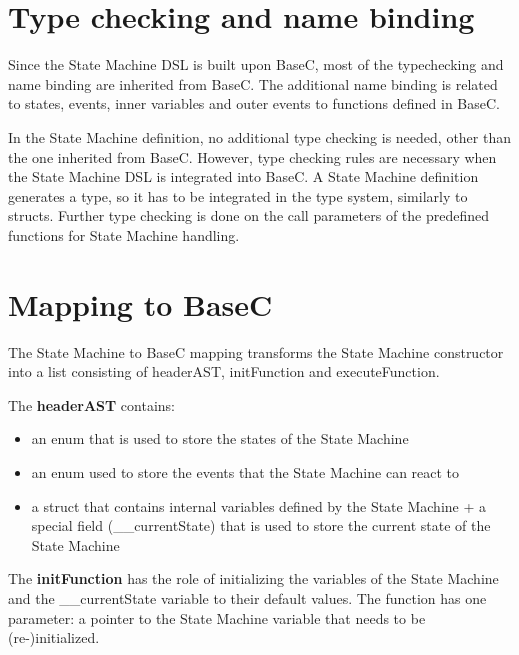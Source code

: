 \documentclass[a4paper,10pt,titlepage]{report}
\begin{document}
\section{Type checking and name binding}
Since the State Machine DSL is built upon BaseC, most of the typechecking and name binding are inherited from BaseC. The additional name binding is related to states, events, inner variables and outer events to functions defined in BaseC. 

In the State Machine definition, no additional type checking is needed, other than the one inherited from BaseC. However, type checking rules are necessary when the State Machine DSL is integrated into BaseC. A State Machine definition generates a type, so it has to be integrated in the type system, similarly to structs. Further type checking is done on the call parameters of the predefined functions for State Machine handling.

\section{Mapping to BaseC}

The State Machine to BaseC mapping transforms the State Machine constructor into a list consisting of headerAST, initFunction and executeFunction. 

The \textbf{headerAST} contains:
\begin{itemize}
\item an enum that is used to store the states of the State Machine 
\item an enum used to store the events that the State Machine can react to
\item a struct that contains internal variables defined by the State Machine + a special field (\_\_currentState) that is used to store the current state of the State Machine
\end{itemize}

The \textbf{initFunction} has the role of initializing the variables of the State Machine and the \_\_currentState variable to their default values. The function has one parameter: a pointer to the State Machine variable that needs to be (re-)initialized.
\end{document}
